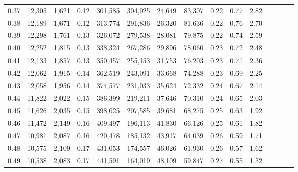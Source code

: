 \begin{tabular}{rrrcrrrrrrrrrrr}
0.37 &  12,305 &  1,621 &                                       0.12 &  301,585 &  304,025 &   24,649 &   83,307 &  0.22 &  0.77 &                         2.82 \\
0.38 &  12,189 &  1,671 &                                       0.12 &  313,774 &  291,836 &   26,320 &   81,636 &  0.22 &  0.76 &                         2.70 \\
0.39 &  12,298 &  1,761 &                                       0.13 &  326,072 &  279,538 &   28,081 &   79,875 &  0.22 &  0.74 &                         2.59 \\
0.40 &  12,252 &  1,815 &                                       0.13 &  338,324 &  267,286 &   29,896 &   78,060 &  0.23 &  0.72 &                         2.48 \\
0.41 &  12,133 &  1,857 &                                       0.13 &  350,457 &  255,153 &   31,753 &   76,203 &  0.23 &  0.71 &                         2.36 \\
0.42 &  12,062 &  1,915 &                                       0.14 &  362,519 &  243,091 &   33,668 &   74,288 &  0.23 &  0.69 &                         2.25 \\
0.43 &  12,058 &  1,956 &                                       0.14 &  374,577 &  231,033 &   35,624 &   72,332 &  0.24 &  0.67 &                         2.14 \\
0.44 &  11,822 &  2,022 &                                       0.15 &  386,399 &  219,211 &   37,646 &   70,310 &  0.24 &  0.65 &                         2.03 \\
0.45 &  11,626 &  2,035 &                                       0.15 &  398,025 &  207,585 &   39,681 &   68,275 &  0.25 &  0.63 &                         1.92 \\
0.46 &  11,472 &  2,149 &                                       0.16 &  409,497 &  196,113 &   41,830 &   66,126 &  0.25 &  0.61 &                         1.82 \\
0.47 &  10,981 &  2,087 &                                       0.16 &  420,478 &  185,132 &   43,917 &   64,039 &  0.26 &  0.59 &                         1.71 \\
0.48 &  10,575 &  2,109 &                                       0.17 &  431,053 &  174,557 &   46,026 &   61,930 &  0.26 &  0.57 &                         1.62 \\
0.49 &  10,538 &  2,083 &                                       0.17 &  441,591 &  164,019 &   48,109 &   59,847 &  0.27 &  0.55 &                         1.52 \\

\end{tabular}
